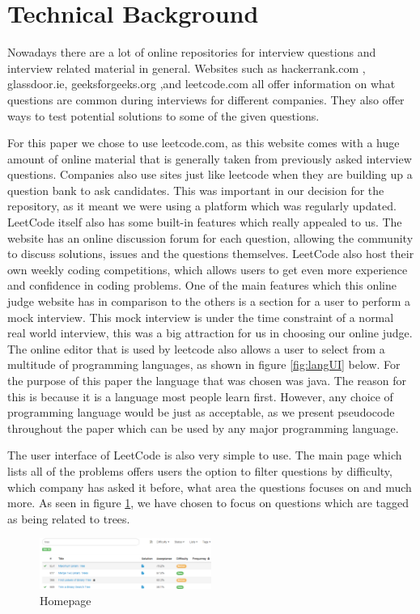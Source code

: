 \documentclass[10pt,twocolumn]{IEEEtran}
\begin{document}
\section{Technical Background}
\par Nowadays there are a lot of online repositories for interview questions and interview related material in general. Websites such as hackerrank.com , glassdoor.ie, geeksforgeeks.org ,and leetcode.com all offer information on what questions are common during interviews for different companies. They also offer ways to test potential solutions to some of the given questions. 
\par For this paper we chose to use leetcode.com\cite{leet1}, as this website comes with a huge amount of online material that is generally taken from previously asked interview questions. Companies also use sites just like leetcode when they are building up a question bank to ask candidates. This was important in our decision for the repository, as it meant we were using a platform which was regularly updated. LeetCode itself also has some built-in features which really appealed to us. The website has an online discussion forum for each question, allowing the community to discuss solutions, issues and the questions themselves. LeetCode also host their own weekly coding competitions, which allows users to get even more experience and confidence in coding problems. One of the main features which this online judge website has in comparison to the others is a section for a user to perform a mock interview. This mock interview is under the time constraint of a normal real world interview, this was a big attraction for us in choosing our online judge. The online editor that is used by leetcode also allows a user to select from a multitude of programming languages, as shown in figure \ref{fig:langUI} below. For the purpose of this paper the language that was chosen was java. The reason for this is because it is a language most people learn first. However, any choice of programming language would be just as acceptable, as we present pseudocode throughout the paper which can be used by any major programming language.  
\par The user interface of LeetCode is also very simple to use. The main page which lists all of the problems offers users the option to filter questions by difficulty, which company has asked it before, what area the questions focuses on and much more. As seen in figure \ref{fig:homepage}, we have chosen to focus on questions which are tagged as being related to trees. 
\begin{figure}[h]
\includegraphics[width=0.5\textwidth]{homepageUI.png}
\caption{Homepage}
\label{fig:homepage}
\end{figure}
\end{document}

